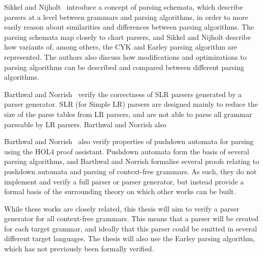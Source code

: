 	Sikkel and Nijholt~\cite{sikkel97} introduce a concept of parsing schemata,
	which describe parsers at a level between grammars and parsing algorithms,
	in order to more easily reason about similarities and differences between
	parsing algorithms. The parsing schemata map closely to chart parsers, and
	Sikkel and Nijholt describe how variants of, among others, the CYK and
	Earley parsing algorithm are represented. The authors also discuss how
	modifications and optimizations to parsing algorithms can be described and
	compared between different parsing algorithms.

	Barthwal and Norrish~\cite{barthwal09} verify the correctness of SLR
	parsers generated by a parser generator. SLR (for Simple LR) parsers are
	designed mainly to reduce the size of the parse tables from LR parsers, and
	are not able to parse all grammar parseable by LR parsers. Barthwal and
	Norrish also

	Barthwal and Norrish~\cite{barthwal13} also verify properties of pushdown
	automata for parsing using the HOL4 proof assistant. Pushdown automata form
	the basis of several parsing algorithms, and Barthwal and Norrish formalise
	several proofs relating to pushdown automata and parsing of context-free
	grammars. As such, they do not implement and verify a full parser or parser
	generator, but instead provide a formal basis of the surrounding theory on
	which other works can be built.

	While these works are closely related, this thesis will aim to verify a
	parser generator for all context-free grammars. This means that a parser
	will be created for each target grammar, and ideally that this parser could
	be emitted in several different target languages. The thesis will also use
	the Earley parsing algorithm, which has not previously been formally
	verified.
